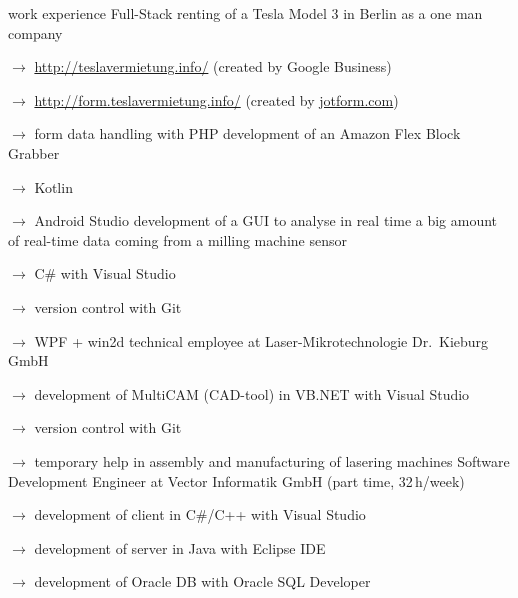 \versionLanguageStart%
\begin{rubric}{\textcolor{black!20!blue!100}{work experience}}%
		\entry*[since 10/2019]
			Full-Stack renting of a Tesla Model 3 in Berlin as a one man company
			
			\setlength{\hangindent}{\widthof{$\rightarrow$ }}
			$\rightarrow$ \url{http://teslavermietung.info/} (created by Google Business)

			$\rightarrow$ \url{http://form.teslavermietung.info/} (created by \href{https://www.jotform.com/}{jotform.com})

			$\rightarrow$ form data handling with PHP
%			
		\entry*[2021 --- 2022]
			development of an Amazon Flex Block Grabber
			
			\setlength{\hangindent}{\widthof{$\rightarrow$ }}
			$\rightarrow$ Kotlin
			
			$\rightarrow$ Android Studio
		\entry*[03/2020 --- 05/2020]
			development of a GUI to analyse in real time a big amount of real-time data coming from a milling machine sensor
			
			\setlength{\hangindent}{\widthof{$\rightarrow$ }}
			$\rightarrow$ C\# with Visual Studio
			
			$\rightarrow$ version control with Git
			
			$\rightarrow$ WPF + win2d
		\entry*[04/07/2019 --- 30/09/2020]
			technical employee at \glqq Laser-Mikrotechnologie Dr.\ Kieburg GmbH\grqq
			
			\setlength{\hangindent}{\widthof{$\rightarrow$ }}
			$\rightarrow$ development of MultiCAM (CAD-tool) in VB.NET with Visual Studio
			
			$\rightarrow$ version control with Git
			
			$\rightarrow$ temporary help in assembly and manufacturing of lasering machines
		\entry*[11/2017 --- 03/2019]
			Software Development Engineer at Vector Informatik GmbH (part time, 32\,h/week)
			
			\setlength{\hangindent}{\widthof{$\rightarrow$ }}
			$\rightarrow$ development of client in C\#/C++ with Visual Studio
			
			$\rightarrow$ development of server in Java with Eclipse IDE
			
			$\rightarrow$ development of Oracle DB with Oracle SQL Developer
			

\end{rubric}

